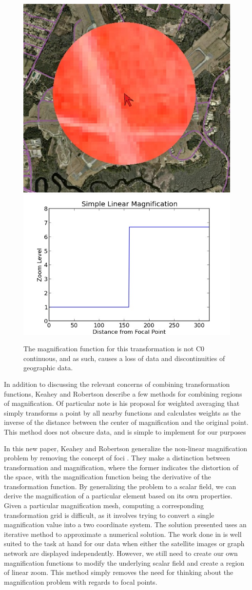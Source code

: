 \begin{figure}[htp] \centering
    \includegraphics[width=0.3\linewidth]{img/non_continuous.jpg}
    \includegraphics[width=0.6\linewidth]{img/discontinuity_graph.jpg}
    \caption[Loss of Visual Data]{The magnification function for this transformation is not C0 continuous, and as such, causes a loss of data and discontinuities of geographic data.}
    \label{fig:non_continuous}
\end{figure}

In addition to discussing the relevant concerns of combining transformation functions, Keahey and Robertson describe a few methods for combining regions of magnification. Of particular note is his proposal for weighted averaging that simply transforms a point by all nearby functions and calculates weights as the inverse of the distance between the center of magnification and the original point. This method does not obscure data, and is simple to implement for our purposes

In this new paper, Keahey and Robertson generalize the non-linear magnification problem by removing the concept of foci \cite{Keahey1997}. They make a distinction between transformation and magnification, where the former indicates the distortion of the space, with the magnification function being the derivative of the transformation function. By generalizing the problem to a scalar field, we can derive the magnification of a particular element based on its own properties. Given a particular magnification mesh, computing a corresponding transformation grid is difficult, as it involves trying to convert a single magnification value into a two coordinate system. The solution presented uses an iterative method to approximate a numerical solution. The work done in is well suited to the task at hand for our data when either the satellite images or graph network are displayed
independently. However, we still need to create our own magnification functions to modify the underlying scalar field and create a region of linear zoom. This method simply removes the need for thinking about the magnification problem with regards to focal points. 

